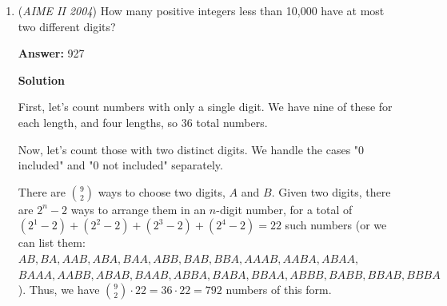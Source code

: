 \begin{enumerate}
 \textbf{Answer: }384



\textbf{Solution}

The $231$ cubes which are not visible must lie below exactly one layer of cubes.  Thus, they form a rectangular solid which is one unit shorter in each dimension.  If the original block has dimensions $l \times m \times n$, we must have $(l - 1)\times(m-1) \times(n - 1) = 231$.  The \href{https://artofproblemsolving.com/wiki/index.php?title=Prime\_factorization}{prime factorization} of $231 = 3\cdot7\cdot11$, so we have a variety of possibilities; for instance, $l - 1 = 1$ and $m - 1 = 11$ and $n - 1 = 3 \cdot 7$, among others.  However, it should be fairly clear that the way to minimize $l\cdot m\cdot n$ is to make $l$ and $m$ and $n$ as close together as possible, which occurs when the smaller block is $3 \times 7 \times 11$.  Then the extra layer makes the entire block $4\times8\times12$, and $N= \boxed{384}$.

 An alternate way to visualize the problem is to count the blocks that can be seen and subtract the blocks that cannot be seen.  In the given block with dimensions $l\times m \times n$, the three faces have $lm$, $mn$, and $ln$ blocks each.  However, $l$ blocks along the first edge, $m$ blocks along the second edge, and $n$ blocks along the third edge were counted twice, so they must be subtracted.  After subtracting these three edges, 1 block has not been counted - it was added three times on each face, but subtracted three times on each side.  Thus, the total number of visible cubes is $lm+mn+ln-l-m-n+1$, and the total number of invisible cubes is $lmn-lm-mn-ln+l+m+n-1$, which can be factored into $(l-1)(m-1)(n-1)$.

 


	\item (\textit{AIME II 2004}) How many positive integers less than 10,000 have at most two different digits?


 
 \textbf{Answer: }927



\textbf{Solution}

First, let's count numbers with only a single digit.  We have nine of these for each length, and four lengths, so 36 total numbers.

 Now, let's count those with two distinct digits.  We handle the cases "0 included" and "0 not included" separately.

 There are ${9 \choose 2}$ ways to choose two digits, $A$ and $B$.  Given two digits, there are $2^n - 2$ ways to arrange them in an $n$-digit number, for a total of $(2^1 - 2) + (2^2 - 2) + (2^3 -2) + (2^4 - 2) = 22$ such numbers (or we can list them: $AB, BA, AAB, ABA, BAA, ABB, BAB, BBA, AAAB, AABA, ABAA,$ $BAAA, AABB, ABAB, BAAB, ABBA, BABA, BBAA, ABBB, BABB, BBAB, BBBA$).  Thus, we have ${9 \choose 2} \cdot 22 = 36\cdot22 = 792$ numbers of this form.


\end{enumerate}
